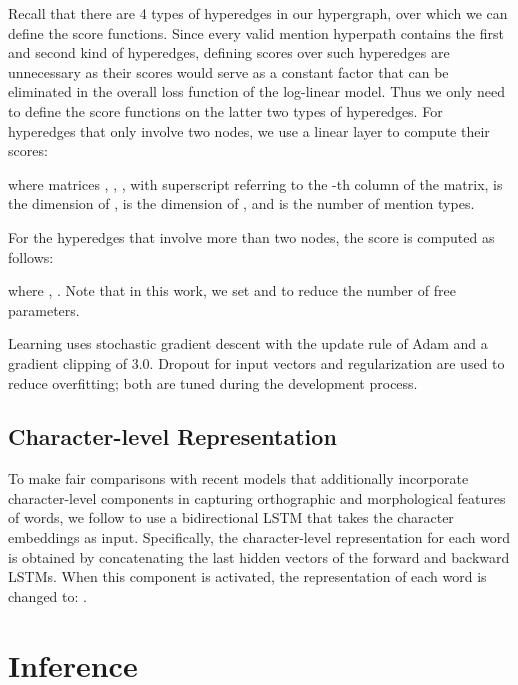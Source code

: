 \documentclass[11pt,a4paper]{article}
\theoremstyle{theorem}
\begin{document}
Recall that there are 4 types of hyperedges in our hypergraph, over which we can define the score functions.
Since every valid mention hyperpath contains the first and second kind of hyperedges, defining scores over such hyperedges are unnecessary
as their scores would serve as a constant factor that can be eliminated in the overall loss function of the log-linear model.
Thus we only need to define the score functions on the latter two types of hyperedges.
For hyperedges that only involve two nodes, we use a linear layer to compute their scores:
\vspace{-3mm}
\begin{center}
\small

\end{center}
where matrices 
,
,
, with superscript  referring to the -th column of the matrix,
 is the dimension of ,  is the dimension of , and  is the number of mention types.


For  the hyperedges that involve more than two nodes, the score is computed as follows:
\begin{center}
\vspace{-3mm}
\small

\end{center}
where
,
.
Note that in this work, we set  and  to reduce the number of free parameters.

Learning uses stochastic gradient descent with the update rule of Adam \cite{kingma2014adam} and a gradient clipping of 3.0.
Dropout \cite{srivastava2014dropout} for input vectors  and  regularization are used to reduce overfitting; both are tuned during the development process.

\subsection{Character-level Representation}

To make fair comparisons with recent models \cite{N18-1131,nest-bw-em18} that additionally incorporate character-level components in capturing orthographic and morphological features of words, we follow \citet{lample2016neural} to use a bidirectional LSTM that takes the  character embeddings as input.
Specifically, the character-level representation  for each word is obtained by concatenating the last hidden vectors of the forward and backward LSTMs.
When this component is activated, the representation of each word is changed to: 
.

\section{Inference}
\end{document}
